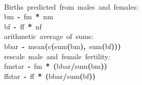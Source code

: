 \documentclass[reqno,12pt,oneside,a4paper]{report} %
\newcommand{\hlfunctioncall}[1]{\textcolor[rgb]{1,0,0}{#1}}%
\newcommand{\hlkeyword}[1]{\textcolor[rgb]{0,0,0}{\textbf{#1}}}%
\newcommand{\hlcomment}[1]{\textcolor[rgb]{0.8,0.8,0.8}{#1}}%
\newcommand{\hlassignement}[1]{\textcolor[rgb]{0.215686274509804,0.215686274509804,0.384313725490196}{\textbf{#1}}}%
\newcommand{\hlsymbol}[1]{\textcolor[rgb]{0,0,0}{#1}}%
\newcommand{\hlprompt}[1]{\textcolor[rgb]{0,0,0}{#1}}%
\newcommand{\hlstd}[1]{\textcolor[rgb]{0,0,0}{#1}}%
\newenvironment{Houtput}{\raggedright}{%
%
}
\theoremstyle{plain}
\theoremstyle{definition}
\theoremstyle{remark}
\numberwithin{theorem}{chapter}     %
\begin{document}
\begin{Houtput}
\hspace*{\fill}\\
\hlstd{}\ttfamily\noindent
\hlprompt{\usebox{\hlnormalsizeboxgreaterthan}{\ }}\hlcomment{\usebox{\hlnormalsizeboxhash}{\ }Births{\ }predicted{\ }from{\ }males{\ }and{\ }females:}\mbox{}
\normalfont
\hspace*{\fill}\\
\hlstd{}\ttfamily\noindent
\hlprompt{\usebox{\hlnormalsizeboxgreaterthan}{\ }}\hlsymbol{bm}{\ }\hlassignement{\usebox{\hlnormalsizeboxlessthan}-}{\ }\hlsymbol{fm}{\ }\hlkeyword{*}{\ }\hlsymbol{nm}\mbox{}
\normalfont
\hspace*{\fill}\\
\hlstd{}\ttfamily\noindent
\hlprompt{\usebox{\hlnormalsizeboxgreaterthan}{\ }}\hlsymbol{bf}{\ }\hlassignement{\usebox{\hlnormalsizeboxlessthan}-}{\ }\hlsymbol{ff}{\ }\hlkeyword{*}{\ }\hlsymbol{nf}\mbox{}
\normalfont
\hspace*{\fill}\\
\hlstd{}\ttfamily\noindent
\hlprompt{\usebox{\hlnormalsizeboxgreaterthan}{\ }}\hlcomment{\usebox{\hlnormalsizeboxhash}{\ }arithmetic{\ }average{\ }of{\ }sums:}\mbox{}
\normalfont
\hspace*{\fill}\\
\hlstd{}\ttfamily\noindent
\hlprompt{\usebox{\hlnormalsizeboxgreaterthan}{\ }}\hlsymbol{bbar}{\ }\hlassignement{\usebox{\hlnormalsizeboxlessthan}-}{\ }\hlfunctioncall{mean}\hlkeyword{(}\hlfunctioncall{c}\hlkeyword{(}\hlfunctioncall{sum}\hlkeyword{(}\hlsymbol{bm}\hlkeyword{)}\hlkeyword{,}{\ }\hlfunctioncall{sum}\hlkeyword{(}\hlsymbol{bf}\hlkeyword{)}\hlkeyword{)}\hlkeyword{)}\mbox{}
\normalfont
\hspace*{\fill}\\
\hlstd{}\ttfamily\noindent
\hlprompt{\usebox{\hlnormalsizeboxgreaterthan}{\ }}\hlcomment{\usebox{\hlnormalsizeboxhash}{\ }rescale{\ }male{\ }and{\ }female{\ }fertility:}\mbox{}
\normalfont
\hspace*{\fill}\\
\hlstd{}\ttfamily\noindent
\hlprompt{\usebox{\hlnormalsizeboxgreaterthan}{\ }}\hlsymbol{fmstar}{\ }\hlassignement{\usebox{\hlnormalsizeboxlessthan}-}{\ }\hlsymbol{fm}{\ }\hlkeyword{*}{\ }\hlkeyword{(}\hlsymbol{bbar}\hlkeyword{/}\hlfunctioncall{sum}\hlkeyword{(}\hlsymbol{bm}\hlkeyword{)}\hlkeyword{)}\mbox{}
\normalfont
\hspace*{\fill}\\
\hlstd{}\ttfamily\noindent
\hlprompt{\usebox{\hlnormalsizeboxgreaterthan}{\ }}\hlsymbol{ffstar}{\ }\hlassignement{\usebox{\hlnormalsizeboxlessthan}-}{\ }\hlsymbol{ff}{\ }\hlkeyword{*}{\ }\hlkeyword{(}\hlsymbol{bbar}\hlkeyword{/}\hlfunctioncall{sum}\hlkeyword{(}\hlsymbol{bf}\hlkeyword{)}\hlkeyword{)}\mbox{}
\normalfont
\hspace*{\fill}\\
\hlstd{}
\end{Houtput}
\doublespacing
\end{document}
